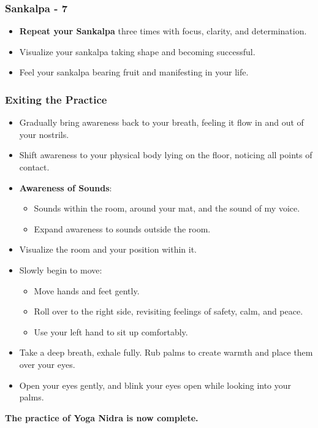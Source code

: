 \begin{frame}[fragile]\frametitle{Sankalpa - 7}
    \begin{itemize}
        \item \textbf{Repeat your Sankalpa} three times with focus, clarity, and determination.
        \item Visualize your sankalpa taking shape and becoming successful.
        \item Feel your sankalpa bearing fruit and manifesting in your life.
    \end{itemize}
\end{frame}

\begin{frame}[fragile]\frametitle{Exiting the Practice}
    \begin{itemize}
        \item Gradually bring awareness back to your breath, feeling it flow in and out of your nostrils.
        \item Shift awareness to your physical body lying on the floor, noticing all points of contact.
        \item \textbf{Awareness of Sounds}:
            \begin{itemize}
                \item Sounds within the room, around your mat, and the sound of my voice.
                \item Expand awareness to sounds outside the room.
            \end{itemize}
        \item Visualize the room and your position within it.
        \item Slowly begin to move: 
            \begin{itemize}
                \item Move hands and feet gently.
                \item Roll over to the right side, revisiting feelings of safety, calm, and peace.
                \item Use your left hand to sit up comfortably.
            \end{itemize}
        \item Take a deep breath, exhale fully. Rub palms to create warmth and place them over your eyes.
        \item Open your eyes gently, and blink your eyes open while looking into your palms.
    \end{itemize}
    \vspace{0.5cm}
    \textbf{The practice of Yoga Nidra is now complete.}
\end{frame}

